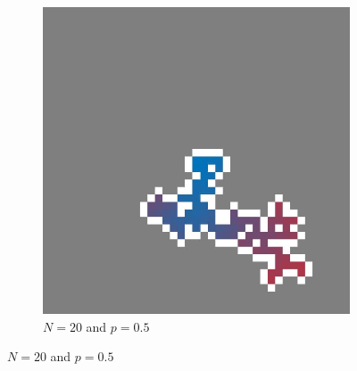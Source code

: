 \begin{figure}[t!]
	\begin{subfigure}{\columnwidth}
		\centering
		\includegraphics[width=\textwidth, height=0.225\textheight, keepaspectratio=true]{./img/fancy_cluster_N20_p5_rng_8}
		\caption{$N = 20$ and $p = 0.5$}
		\label{fig:method:fin_inf:finiteLarge}
	\end{subfigure}


\end{figure}
